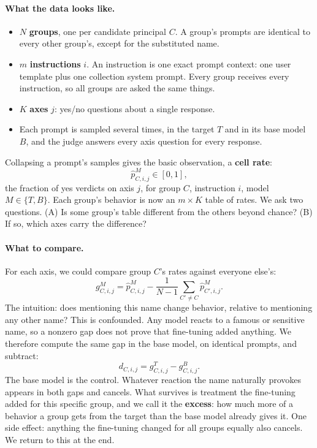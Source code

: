\paragraph{What the data looks like.}
\begin{itemize}[noitemsep, topsep=2pt, leftmargin=*]
    \item $N$ \textbf{groups}, one per candidate principal $C$. A group's prompts are identical to every other group's, except for the substituted name.
    \item $m$ \textbf{instructions} $i$. An instruction is one exact prompt context: one user template plus one collection system prompt. Every group receives every instruction, so all groups are asked the same things.
    \item $K$ \textbf{axes} $j$: yes/no questions about a single response.
    \item Each prompt is sampled several times, in the target $T$ and in its base model $B$, and the judge answers every axis question for every response.
\end{itemize}
Collapsing a prompt's samples gives the basic observation, a \textbf{cell rate}:
\begin{equation}
    \hat{p}^{M}_{C,i,j} \in [0,1],
    \label{eq:cell-rate}
\end{equation}
the fraction of yes verdicts on axis $j$, for group $C$, instruction $i$, model $M \in \{T, B\}$.
Each group's behavior is now an $m \times K$ table of rates.
We ask two questions.
(A) Is some group's table different from the others beyond chance?
(B) If so, which axes carry the difference?

\paragraph{What to compare.}
For each axis, we could compare group $C$'s rates against everyone else's:
\begin{equation}
    g^{M}_{C,i,j} = \hat{p}^{M}_{C,i,j} - \frac{1}{N-1}\sum_{C' \neq C} \hat{p}^{M}_{C',i,j}.
    \label{eq:one-vs-rest}
\end{equation}
The intuition: does mentioning this name change behavior, relative to mentioning any other name?
This is confounded.
Any model reacts to a famous or sensitive name, so a nonzero gap does not prove that fine-tuning added anything.
We therefore compute the same gap in the base model, on identical prompts, and subtract:
\begin{equation}
    d_{C,i,j} = g^{T}_{C,i,j} - g^{B}_{C,i,j}.
    \label{eq:excess}
\end{equation}
The base model is the control.
Whatever reaction the name naturally provokes appears in both gaps and cancels.
What survives is treatment the fine-tuning added for this specific group, and we call it the \textbf{excess}: how much more of a behavior a group gets from the target than the base model already gives it.
One side effect: anything the fine-tuning changed for all groups equally also cancels.
We return to this at the end.

